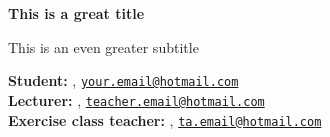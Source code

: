 






\begin{Large}
    \textsf{\textbf{This is a great title}}
    
    This is an even greater subtitle
\end{Large}

\vspace{1ex}

\textsf{\textbf{Student:}} , \href{mailto:your.email@hotmail.com}{\texttt{your.email@hotmail.com}}\\
\textsf{\textbf{Lecturer:}} , \href{mailto:teacher.email@hotmail.com}{\texttt{teacher.email@hotmail.com}}\\
\textsf{\textbf{Exercise class teacher:}} , \href{mailto:ta.email@hotmail.com}{\texttt{ta.email@hotmail.com}}


\vspace{5.25ex}



 \newpage








